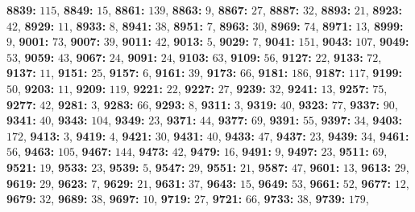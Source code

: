 \textsf{\bfseries 8839:} $115$, \textsf{\bfseries 8849:} $15$, \textsf{\bfseries 8861:} $139$, \textsf{\bfseries 8863:} $9$, \textsf{\bfseries 8867:} $27$, \textsf{\bfseries 8887:} $32$, \textsf{\bfseries 8893:} $21$, \textsf{\bfseries 8923:} $42$, \textsf{\bfseries 8929:} $11$, \textsf{\bfseries 8933:} $8$, \textsf{\bfseries 8941:} $38$, \textsf{\bfseries 8951:} $7$, \textsf{\bfseries 8963:} $30$, \textsf{\bfseries 8969:} $74$, \textsf{\bfseries 8971:} $13$, \textsf{\bfseries 8999:} $9$, \textsf{\bfseries 9001:} $73$, \textsf{\bfseries 9007:} $39$, \textsf{\bfseries 9011:} $42$, \textsf{\bfseries 9013:} $5$, \textsf{\bfseries 9029:} $7$, \textsf{\bfseries 9041:} $151$, \textsf{\bfseries 9043:} $107$, \textsf{\bfseries 9049:} $53$, \textsf{\bfseries 9059:} $43$, \textsf{\bfseries 9067:} $24$, \textsf{\bfseries 9091:} $24$, \textsf{\bfseries 9103:} $63$, \textsf{\bfseries 9109:} $56$, \textsf{\bfseries 9127:} $22$, \textsf{\bfseries 9133:} $72$, \textsf{\bfseries 9137:} $11$, \textsf{\bfseries 9151:} $25$, \textsf{\bfseries 9157:} $6$, \textsf{\bfseries 9161:} $39$, \textsf{\bfseries 9173:} $66$, \textsf{\bfseries 9181:} $186$, \textsf{\bfseries 9187:} $117$, \textsf{\bfseries 9199:} $50$, \textsf{\bfseries 9203:} $11$, \textsf{\bfseries 9209:} $119$, \textsf{\bfseries 9221:} $22$, \textsf{\bfseries 9227:} $27$, \textsf{\bfseries 9239:} $32$, \textsf{\bfseries 9241:} $13$, \textsf{\bfseries 9257:} $75$, \textsf{\bfseries 9277:} $42$, \textsf{\bfseries 9281:} $3$, \textsf{\bfseries 9283:} $66$, \textsf{\bfseries 9293:} $8$, \textsf{\bfseries 9311:} $3$, \textsf{\bfseries 9319:} $40$, \textsf{\bfseries 9323:} $77$, \textsf{\bfseries 9337:} $90$, \textsf{\bfseries 9341:} $40$, \textsf{\bfseries 9343:} $104$, \textsf{\bfseries 9349:} $23$, \textsf{\bfseries 9371:} $44$, \textsf{\bfseries 9377:} $69$, \textsf{\bfseries 9391:} $55$, \textsf{\bfseries 9397:} $34$, \textsf{\bfseries 9403:} $172$, \textsf{\bfseries 9413:} $3$, \textsf{\bfseries 9419:} $4$, \textsf{\bfseries 9421:} $30$, \textsf{\bfseries 9431:} $40$, \textsf{\bfseries 9433:} $47$, \textsf{\bfseries 9437:} $23$, \textsf{\bfseries 9439:} $34$, \textsf{\bfseries 9461:} $56$, \textsf{\bfseries 9463:} $105$, \textsf{\bfseries 9467:} $144$, \textsf{\bfseries 9473:} $42$, \textsf{\bfseries 9479:} $16$, \textsf{\bfseries 9491:} $9$, \textsf{\bfseries 9497:} $23$, \textsf{\bfseries 9511:} $69$, \textsf{\bfseries 9521:} $19$, \textsf{\bfseries 9533:} $23$, \textsf{\bfseries 9539:} $5$, \textsf{\bfseries 9547:} $29$, \textsf{\bfseries 9551:} $21$, \textsf{\bfseries 9587:} $47$, \textsf{\bfseries 9601:} $13$, \textsf{\bfseries 9613:} $29$, \textsf{\bfseries 9619:} $29$, \textsf{\bfseries 9623:} $7$, \textsf{\bfseries 9629:} $21$, \textsf{\bfseries 9631:} $37$, \textsf{\bfseries 9643:} $15$, \textsf{\bfseries 9649:} $53$, \textsf{\bfseries 9661:} $52$, \textsf{\bfseries 9677:} $12$, \textsf{\bfseries 9679:} $32$, \textsf{\bfseries 9689:} $38$, \textsf{\bfseries 9697:} $10$, \textsf{\bfseries 9719:} $27$, \textsf{\bfseries 9721:} $66$, \textsf{\bfseries 9733:} $38$, \textsf{\bfseries 9739:} $179$, 
